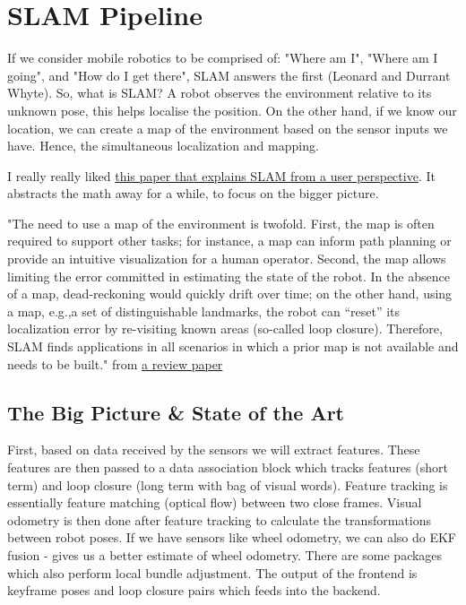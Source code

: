 \chapter{SLAM Pipeline}

If we consider mobile robotics to be comprised of: "Where am I", "Where am I going", and "How do I get there", SLAM answers the first (Leonard and Durrant Whyte). So, what is SLAM? A robot observes the environment relative to its unknown pose, this helps localise the position. On the other hand, if we know our location, we can create a map of the environment based on the sensor inputs we have. Hence, the simultaneous localization and mapping. 

I really really liked \href{http://www.informatik.uni-bremen.de/agebv2/downloads/published/freseki10.pdf}{this paper that explains SLAM from a user perspective}. It abstracts the math away for a while, to focus on the bigger picture.

"The  need  to  use  a  map  of  the  environment  is  twofold. First,  the  map is  often  required  to  support  other  tasks;  for instance,  a  map  can  inform  path  planning  or  provide  an intuitive visualization for a human operator. Second, the map allows limiting the error committed in estimating the state of the  robot.  In  the  absence  of  a  map,  dead-reckoning  would quickly drift over time; on the other hand, using a map, e.g.,a  set  of  distinguishable  landmarks,  the  robot  can  “reset”  its localization  error  by  re-visiting  known  areas  (so-called loop closure). Therefore, SLAM finds applications in all scenarios in which a prior map is not available and needs to be built." from \href{https://arxiv.org/pdf/1606.05830.pdf#page=1&zoom=auto,-18,801}{ a review paper}

\section{The Big Picture \& State of the Art}

First, based on data received by the sensors we will extract features. These features are then passed to a data association block which tracks features (short term) and loop closure (long term with bag of visual words). Feature tracking is essentially feature matching (optical flow) between two close frames. Visual odometry is then done after feature tracking to calculate the transformations between robot poses. If we have sensors like wheel odometry, we can also do EKF fusion - gives us a better estimate of wheel odometry. There are some packages which also perform local bundle adjustment. The output of the frontend is keyframe poses and loop closure pairs which feeds into the backend.

